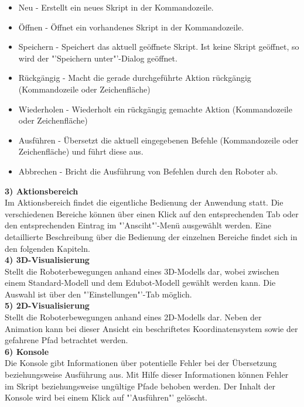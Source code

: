 \begin{itemize}
\item Neu - Erstellt ein neues Skript in der Kommandozeile.
\item Öffnen - Öffnet ein vorhandenes Skript in der Kommandozeile.
\item Speichern - Speichert das aktuell geöffnete Skript. Ist keine Skript geöffnet, so wird der "'Speichern unter"'-Dialog geöffnet.
\item Rückgängig - Macht die gerade durchgeführte Aktion rückgängig (Kommandozeile oder Zeichenfläche)
\item Wiederholen - Wiederholt ein rückgängig gemachte Aktion  (Kommandozeile oder Zeichenfläche)
\item Ausführen - Übersetzt die aktuell eingegebenen Befehle (Kommandozeile oder Zeichenfläche) und führt diese aus.
\item Abbrechen - Bricht die Ausführung von Befehlen durch den Roboter ab.
\end{itemize}
\textbf{3) Aktionsbereich}\\
Im Aktionsbereich findet die eigentliche Bedienung der Anwendung statt. Die verschiedenen Bereiche können über einen Klick auf den entsprechenden Tab oder den entsprechenden Eintrag im "'Ansciht"'-Menü ausgewählt werden. Eine detaillierte Beschreibung über die Bedienung der einzelnen Bereiche findet sich in den folgenden Kapiteln.\\
\textbf{4) 3D-Visualisierung}\\
Stellt die Roboterbewegungen anhand eines 3D-Modells dar, wobei zwischen einem Standard-Modell und dem Edubot-Modell gewählt werden kann. Die Auswahl ist über den "'Einstellungen"'-Tab möglich.\\
\textbf{5) 2D-Visualisierung}\\
Stellt die Roboterbewegungen anhand eines 2D-Modells dar. Neben der Animation kann bei dieser Ansicht ein beschriftetes Koordinatensystem sowie der gefahrene Pfad betrachtet werden.\\
\textbf{6) Konsole}\\
Die Konsole gibt Informationen über potentielle Fehler bei  der Übersetzung beziehungsweise Ausführung aus. Mit Hilfe dieser Informationen können Fehler im Skript beziehungsweise ungültige Pfade behoben werden. Der Inhalt der Konsole wird bei einem Klick auf "'Ausführen"' gelöscht.
